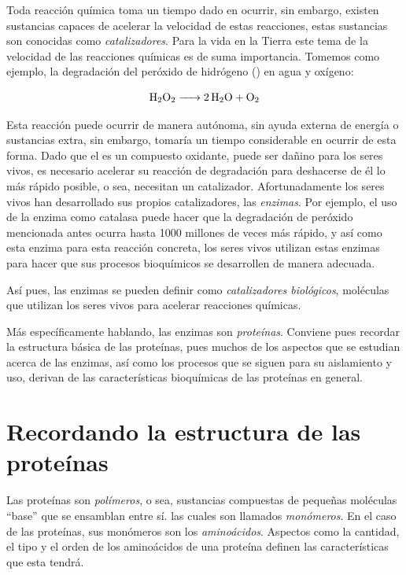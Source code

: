 
Toda reacción química toma un tiempo dado en ocurrir, sin embargo, existen sustancias capaces de acelerar la velocidad de estas reacciones, estas sustancias son conocidas como \emph{catalizadores}. Para la vida en la Tierra este tema de la velocidad de las reacciones químicas es de suma importancia. Tomemos como ejemplo, la degradación del peróxido de hidrógeno () en agua y oxígeno: 

\begin{equation*}
    \ce{H2O2 -> 2H2O + O2}
\end{equation*}

Esta reacción puede ocurrir de manera autónoma, sin ayuda externa de energía o sustancias extra, sin embargo, tomaría un tiempo considerable en ocurrir de esta forma. Dado que el  es un compuesto oxidante, puede ser dañino para los seres vivos, es necesario acelerar su reacción de degradación para deshacerse de él lo más rápido posible, o sea, necesitan un catalizador. Afortunadamente los seres vivos han desarrollado sus propios catalizadores, las \emph{enzimas}. Por ejemplo, el uso de la enzima como catalasa puede hacer que la degradación de peróxido mencionada antes ocurra hasta 1000 millones de veces más rápido\citep{mathewsBioquimica2002}, y así como esta enzima para esta reacción concreta, los seres vivos utilizan estas enzimas para hacer que sus procesos bioquímicos se desarrollen de manera adecuada.

Así pues, las enzimas se pueden definir como \emph{catalizadores biológicos}, moléculas que utilizan los seres vivos para acelerar reacciones químicas.

Más específicamente hablando, las enzimas son \emph{proteínas}. Conviene pues recordar la estructura básica de las proteínas, pues muchos de los aspectos que se estudian acerca de las enzimas, así como los procesos que se siguen para su aislamiento y uso, derivan de las características bioquímicas de las proteínas en general.



\section{Recordando la estructura de las proteínas}\label{sec:estructura_proteica_de_las_enzimas}

Las proteínas son \emph{polímeros}, o sea, sustancias compuestas de pequeñas moléculas ``base'' que se ensamblan entre sí. las cuales son llamados \emph{monómeros}. En el caso de las proteínas, sus monómeros son los \emph{aminoácidos}. Aspectos como la cantidad, el tipo y el orden de los aminoácidos de una proteína definen las características que esta tendrá.

